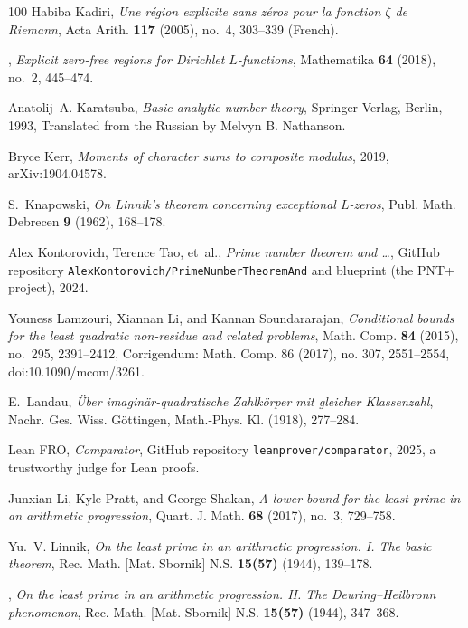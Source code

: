 \documentclass[11pt]{amsart}
\numberwithin{equation}{section}
\theoremstyle{plain}
\theoremstyle{definition}
\theoremstyle{remark}
\newcommand{\1}{\mathbf{1}}
\begin{document}
\begin{thebibliography}{100}
Habiba Kadiri, \emph{Une r{\'e}gion explicite sans z{\'e}ros pour la fonction
  {$\zeta$} de {R}iemann}, Acta Arith. \textbf{117} (2005), no.~4, 303--339
  (French).

\bysame, \emph{Explicit zero-free regions for {D}irichlet {$L$}-functions},
  Mathematika \textbf{64} (2018), no.~2, 445--474.

Anatolij~A. Karatsuba, \emph{Basic analytic number theory}, Springer-Verlag,
  Berlin, 1993, Translated from the Russian by Melvyn B. Nathanson.

Bryce Kerr, \emph{Moments of character sums to composite modulus}, 2019,
  arXiv:1904.04578.

S.~Knapowski, \emph{On {L}innik's theorem concerning exceptional {$L$}-zeros},
  Publ. Math. Debrecen \textbf{9} (1962), 168--178.

Alex Kontorovich, Terence Tao, et~al., \emph{Prime number theorem and \ldots},
  GitHub repository \texttt{AlexKontorovich/PrimeNumberTheoremAnd} and
  blueprint (the {PNT+} project), 2024.

Youness Lamzouri, Xiannan Li, and Kannan Soundararajan, \emph{Conditional
  bounds for the least quadratic non-residue and related problems}, Math. Comp.
  \textbf{84} (2015), no.~295, 2391--2412, Corrigendum: Math. Comp. 86 (2017),
  no. 307, 2551--2554, doi:10.1090/mcom/3261.

E.~Landau, \emph{{\"U}ber imagin{\"a}r-quadratische {Z}ahlk{\"o}rper mit
  gleicher {K}lassenzahl}, Nachr. Ges. Wiss. G{\"o}ttingen, Math.-Phys. Kl.
  (1918), 277--284.

{Lean FRO}, \emph{Comparator}, GitHub repository
  \texttt{leanprover/comparator}, 2025, a trustworthy judge for Lean proofs.

Junxian Li, Kyle Pratt, and George Shakan, \emph{A lower bound for the least
  prime in an arithmetic progression}, Quart. J. Math. \textbf{68} (2017),
  no.~3, 729--758.

Yu.~V. Linnik, \emph{On the least prime in an arithmetic progression. {I}.
  {T}he basic theorem}, Rec. Math. [Mat. Sbornik] N.S. \textbf{15(57)} (1944),
  139--178. 

\bysame, \emph{On the least prime in an arithmetic progression. {II}. {T}he
  {D}euring--{H}eilbronn phenomenon}, Rec. Math. [Mat. Sbornik] N.S.
  \textbf{15(57)} (1944), 347--368. 


\end{thebibliography}
\end{document}
